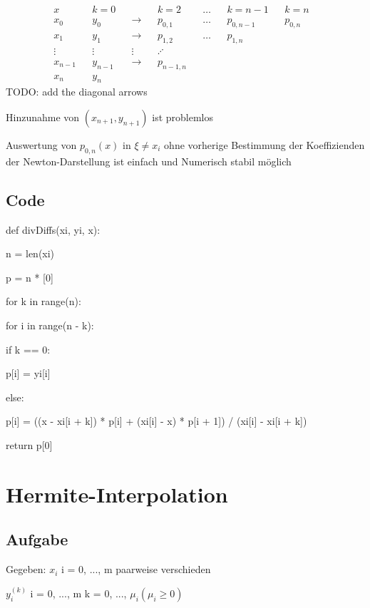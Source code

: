\documentclass[12pt,a4paper]{article} %
\newcommand*\tab[1][1cm]{\hspace*{#1}}
\begin{document}
	\begin{align*}
		x && k = 0 && && k = 2 && {}\ldots{} && k = n - 1 && k = n & \\
		x_0 && y_0 && \longrightarrow && p_{0, 1} && {}\ldots{} && p_{0, n - 1} && p_{0, n} & \\
		x_1 && y_1 && \longrightarrow && p_{1, 2} && {}\ldots{} && p_{1, n} & \\
		\vdots && \vdots && \vdots && \iddots & \\
		x_{n - 1} && y_{n - 1} && \longrightarrow && p_{n - 1, n} & \\
		x_n && y_n
	\end{align*}
	TODO: add the diagonal arrows
	
	Hinzunahme von $(x_{n + 1}, y_{n + 1})$ ist problemlos
	
	Auswertung von $p_{0, n}(x)$ in $\xi \ne x_i$ ohne vorherige Bestimmung der Koeffizienden der Newton-Darstellung ist einfach und Numerisch stabil möglich
	
	\subsection{Code}
	
	def divDiffs(xi, yi, x):
	
	n = len(xi)
	
	p = n * [0]
	
	for k in range(n):
	
	\tab for i in range(n - k):
	
	\tab \tab if k == 0:

	\tab \tab \tab p[i] = yi[i]
	
	\tab \tab else:
	
	\tab \tab \tab p[i] = ((x - xi[i + k]) * p[i] + (xi[i] - x) * p[i + 1]) / (xi[i] - xi[i + k])
	
	return p[0]	
	
	\newpage
	
	\section{Hermite-Interpolation}
	
	\subsection{Aufgabe}
	
	Gegeben: $x_i$ \tab \space i = 0, ..., m \tab paarweise verschieden
	
	\tab \space $y_i^{(k)}$ \tab i = 0, ..., m \tab k = 0, ..., $\mu_i (\mu_i \ge 0)$
	
\end{document}
